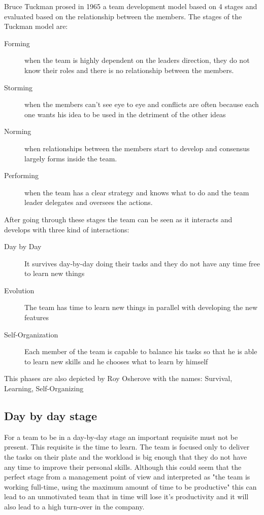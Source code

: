 
Bruce Tuckman prosed in 1965 a team development model based on 4 stages and evaluated based on the relationship between the members. The stages of the Tuckman model are:
\begin{description}
\item[Forming] when the team is highly dependent on the leaders direction, they do not know their roles and there is no relationship between the members.
\item[Storming] when the members can't see eye to eye and conflicts are often because each one wants his idea to be used in the detriment of the other ideas
\item[Norming] when relationships between the members start to develop and consensus largely forms inside the team.
\item[Performing] when the team has a clear strategy and knows what to do and the team leader delegates and oversees the actions.
\end{description}

After going through these stages the team can be seen as it interacts and develops with three kind of interactions:
\begin{description}
\item [Day by Day] It survives day-by-day doing their tasks and they do not have any time free to learn new things
\item [Evolution] The team has time to learn new things in parallel with developing the new features
\item [Self-Organization] Each member of the team is capable to balance his tasks so that he is able to learn new skills and he chooses what to learn by himself
\end{description}

This phases are also depicted by Roy Osherove \cite{notes-to-a-software-team-leader} with the names: Survival, Learning, Self-Organizing

\subsection{Day by day stage}

For a team to be in a day-by-day stage an important requisite must not be present. This requisite is the time to learn. The team is focused only to deliver the tasks on their plate and the workload is big enough that they do not have any time to improve their personal skills. Although this could seem that the perfect stage from a management point of view and interpreted as "the team is working full-time, using the maximum amount of time to be productive" this can lead to an unmotivated team that in time will lose it's productivity and it will also lead to a high turn-over in the company. 

